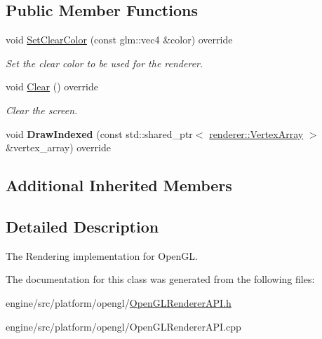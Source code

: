 \subsection*{Public Member Functions}
\begin{DoxyCompactItemize}
\item 
\mbox{\label{classengine_1_1platform_1_1opengl_1_1OpenGLRendererAPI_acb9245e152e00f743705cf9684d7c0b8}} 
void \hyperlink{classengine_1_1platform_1_1opengl_1_1OpenGLRendererAPI_acb9245e152e00f743705cf9684d7c0b8}{Set\+Clear\+Color} (const glm\+::vec4 \&color) override
\begin{DoxyCompactList}\small\item\em Set the clear color to be used for the renderer. \end{DoxyCompactList}\item 
\mbox{\label{classengine_1_1platform_1_1opengl_1_1OpenGLRendererAPI_acd0417acd23f138a61190f1896461b56}} 
void \hyperlink{classengine_1_1platform_1_1opengl_1_1OpenGLRendererAPI_acd0417acd23f138a61190f1896461b56}{Clear} () override
\begin{DoxyCompactList}\small\item\em Clear the screen. \end{DoxyCompactList}\item 
\mbox{\label{classengine_1_1platform_1_1opengl_1_1OpenGLRendererAPI_ad21a7364823597c094941caae6ef32fa}} 
void {\bfseries Draw\+Indexed} (const std\+::shared\+\_\+ptr$<$ \hyperlink{classengine_1_1renderer_1_1VertexArray}{renderer\+::\+Vertex\+Array} $>$ \&vertex\+\_\+array) override
\end{DoxyCompactItemize}
\subsection*{Additional Inherited Members}


\subsection{Detailed Description}
The Rendering implementation for Open\+GL. 

The documentation for this class was generated from the following files\+:\begin{DoxyCompactItemize}
\item 
engine/src/platform/opengl/\hyperlink{OpenGLRendererAPI_8h}{Open\+G\+L\+Renderer\+A\+P\+I.\+h}\item 
engine/src/platform/opengl/Open\+G\+L\+Renderer\+A\+P\+I.\+cpp\end{DoxyCompactItemize}
